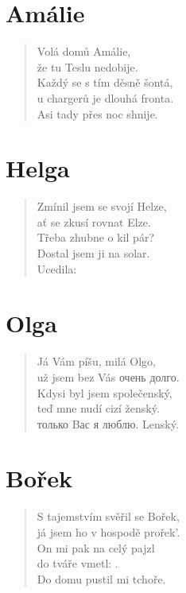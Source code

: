 \section*{Amálie}
\begin{verse}
Volá domů Amálie,\\
že tu Teslu nedobije.\\
Každý se s tím děsně šontá,\\
u chargerů je dlouhá fronta.\\
Asi tady přes noc shnije.
\end{verse}    

\section*{Helga}
\begin{verse}
Zmínil jsem se svojí Helze,\\
ať se zkusí rovnat Elze.\\
Třeba zhubne o kil pár?\\
Dostal jsem ji na solar.\\
Ucedila: 
\end{verse} 
   
\section*{Olga}
\begin{verse}
Já Vám píšu, milá Olgo,\\
už jsem bez Vás \foreignlanguage{russian}{очень долго}.\\
Kdysi byl jsem společenský,\\
teď mne nudí cizí ženský.\\
\foreignlanguage{russian}{только Bас я люблю}. Lenský.
\end{verse}

\section*{Bořek}
\begin{verse}
S tajemstvím svěřil se Bořek,\\
já jsem ho v hospodě prořek'.\\
On mi pak na celý pajzl\\
do tváře vmetl: .\\
Do domu pustil mi tchoře.
\end{verse}    

